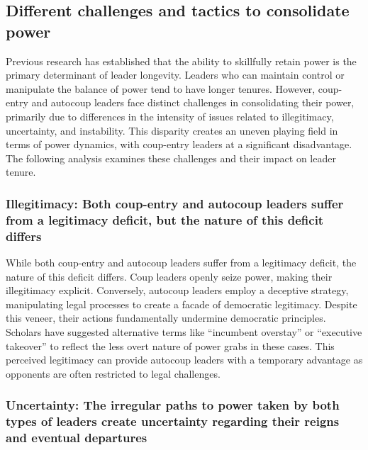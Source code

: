 \documentclass[
  12pt,
]{report}
\begin{document}
\subsection{Different challenges and tactics to consolidate
power}\label{different-challenges-and-tactics-to-consolidate-power}

Previous research has established that the ability to skillfully retain
power is the primary determinant of leader longevity. Leaders who can
maintain control or manipulate the balance of power tend to have longer
tenures. However, coup-entry and autocoup leaders face distinct
challenges in consolidating their power, primarily due to differences in
the intensity of issues related to illegitimacy, uncertainty, and
instability. This disparity creates an uneven playing field in terms of
power dynamics, with coup-entry leaders at a significant disadvantage.
The following analysis examines these challenges and their impact on
leader tenure.

\subsubsection{Illegitimacy: Both coup-entry and autocoup leaders suffer
from a legitimacy deficit, but the nature of this deficit
differs}\label{illegitimacy-both-coup-entry-and-autocoup-leaders-suffer-from-a-legitimacy-deficit-but-the-nature-of-this-deficit-differs}

While both coup-entry and autocoup leaders suffer from a legitimacy
deficit, the nature of this deficit differs. Coup leaders openly seize
power, making their illegitimacy explicit. Conversely, autocoup leaders
employ a deceptive strategy, manipulating legal processes to create a
facade of democratic legitimacy. Despite this veneer, their actions
fundamentally undermine democratic principles. Scholars have suggested
alternative terms like ``incumbent overstay'' or ``executive takeover''
to reflect the less overt nature of power grabs in these cases. This
perceived legitimacy can provide autocoup leaders with a temporary
advantage as opponents are often restricted to legal challenges.

\subsubsection{\texorpdfstring{\textbf{Uncertainty:} The irregular paths
to power taken by both types of leaders create uncertainty regarding
their reigns and eventual
departures}{Uncertainty: The irregular paths to power taken by both types of leaders create uncertainty regarding their reigns and eventual departures}}\label{uncertainty-the-irregular-paths-to-power-taken-by-both-types-of-leaders-create-uncertainty-regarding-their-reigns-and-eventual-departures}
\end{document}
